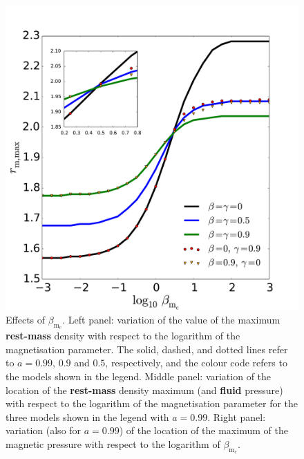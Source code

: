 \documentclass[]{aa}
\begin{document}
\begin{figure}
\hspace{-0.2cm}
\includegraphics[scale=0.14]{figures/fig6c.pdf}
\caption{Effects of $\beta_{\mathrm{m}_{\mathrm{c}}}$. Left panel: variation of the value of the maximum {\bf rest-mass} density with respect to the logarithm of the magnetisation parameter. The solid, dashed, and dotted lines refer to $a = 0.99$, $0.9$ and $0.5$, respectively, and the colour code refers to the models shown in the legend. Middle panel: variation of the location of the {\bf rest-mass} density maximum (and {\bf fluid} pressure) with respect to the logarithm of the magnetisation parameter for the three models shown in the legend with $a = 0.99$. Right panel: variation (also for $a = 0.99$) of the location of the maximum of the magnetic pressure with respect to the logarithm of $\beta_{\mathrm{m}_{\mathrm{c}}}$.}
           \label{max-vs-magnetisation}%
 \end{figure}
 
\end{document}
